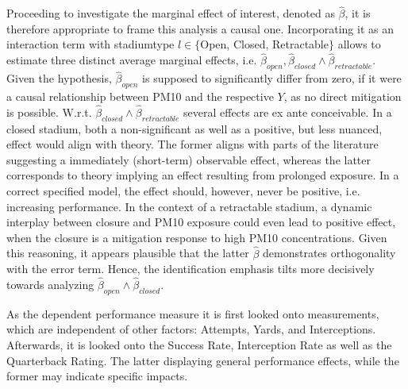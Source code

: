 \documentclass[12pt,a4paper]{article}
\begin{document}
{Proceeding to investigate the marginal effect of interest, denoted as $\hat{\beta}$, it is therefore appropriate to frame this analysis a causal one.  Incorporating it as an interaction term with stadiumtype $l \in \{$Open, Closed, Retractable$\}$ allows to estimate three distinct average marginal effects, i.e. $\hat{\beta}_{open},\hat{\beta}_{closed} \wedge \hat{\beta}_{retractable}$. Given the hypothesis, $\hat{\beta}_{open}$ is supposed to significantly differ from zero, if it were a causal relationship between PM10 and the respective $Y$, as no direct mitigation is possible. W.r.t. $\hat{\beta}_{closed} \wedge \hat{\beta}_{retractable}$ several effects are ex ante conceivable. In a closed stadium, both a non-significant as well as a positive, but less nuanced, effect would align with theory. The former aligns with parts of the literature suggesting a immediately (short-term)  observable effect, whereas the latter corresponds to theory implying an effect resulting from prolonged exposure. In a correct specified model, the effect should, however, never be positive, i.e. increasing performance. In the context of a retractable stadium, a dynamic interplay between closure and PM10 exposure could even lead to positive effect, when the closure is a mitigation response to high PM10 concentrations. Given this reasoning, it appears plausible that the latter $\hat{\beta}$ demonstrates orthogonality with the error term. Hence, the identification emphasis tilts more decisively towards analyzing $\hat{\beta}_{open} \wedge \hat{\beta}_{closed}$.

As the dependent performance measure it is first looked onto measurements, which are independent of other factors: Attempts, Yards, and Interceptions. Afterwards, it is looked onto the Success Rate, Interception Rate as well as the Quarterback Rating. The latter displaying general performance effects, while the former may indicate specific impacts.

}
\end{document}
